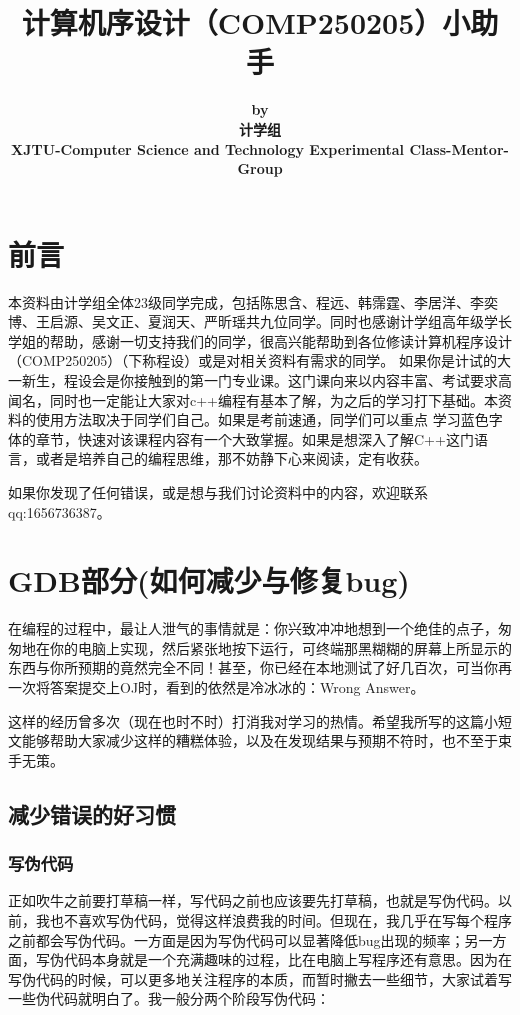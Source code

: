 \documentclass[UTF8]{ctexart}
\title{计算机序设计（COMP250205）小助手}
\author{%
	\textbf{\large by}\\ %
    \textbf{\large 计学组}\\ %
    \textbf{\large XJTU-Computer Science and Technology Experimental Class-Mentor-Group}\\ %
}
\date{}
\begin{document}
	\maketitle
	\thispagestyle{empty}
	\newpage
	\setcounter{page}{1}
\newpage
\tableofcontents
\newpage
\thispagestyle{fancy} %
\fancyhf{} %
\section{前言}
本资料由计学组全体23级同学完成，包括陈思含、程远、韩霈霆、李居洋、李奕博、王启源、吴文正、夏润天、严昕瑶共九位同学。同时也感谢计学组高年级学长学姐的帮助，感谢一切支持我们的同学，很高兴能帮助到各位修读计算机程序设计（COMP250205）（下称程设）或是对相关资料有需求的同学。
如果你是计试的大一新生，程设会是你接触到的第一门专业课。这门课向来以内容丰富、考试要求高闻名，同时也一定能让大家对c++编程有基本了解，为之后的学习打下基础。本资料的使用方法取决于同学们自己。如果是考前速通，同学们可以重点
学习蓝色字体的章节，快速对该课程内容有一个大致掌握。如果是想深入了解C++这门语言，或者是培养自己的编程思维，那不妨静下心来阅读，定有收获。

如果你发现了任何错误，或是想与我们讨论资料中的内容，欢迎联系qq:1656736387。
\newpage
\section{GDB部分(如何减少与修复bug)}
在编程的过程中，最让人泄气的事情就是：你兴致冲冲地想到一个绝佳的点子，匆匆地在你的电脑上实现，然后紧张地按下运行，可终端那黑糊糊的屏幕上所显示的东西与你所预期的竟然完全不同！甚至，你已经在本地测试了好几百次，可当你再一次将答案提交上OJ时，看到的依然是冷冰冰的：Wrong Answer。

这样的经历曾多次（现在也时不时）打消我对学习的热情。希望我所写的这篇小短文能够帮助大家减少这样的糟糕体验，以及在发现结果与预期不符时，也不至于束手无策。

\subsection{减少错误的好习惯}

\subsubsection{写伪代码}
正如吹牛之前要打草稿一样，写代码之前也应该要先打草稿，也就是写伪代码。以前，我也不喜欢写伪代码，觉得这样浪费我的时间。但现在，我几乎在写每个程序之前都会写伪代码。一方面是因为写伪代码可以显著降低bug出现的频率；另一方面，写伪代码本身就是一个充满趣味的过程，比在电脑上写程序还有意思。因为在写伪代码的时候，可以更多地关注程序的本质，而暂时撇去一些细节，大家试着写一些伪代码就明白了。我一般分两个阶段写伪代码：
\end{document}
